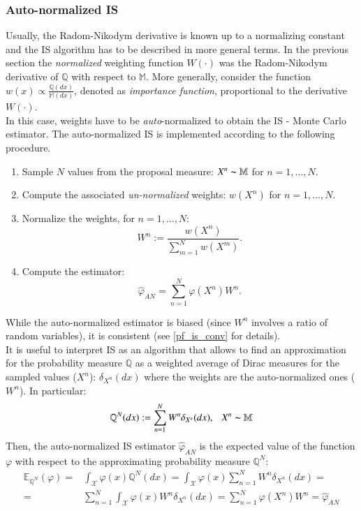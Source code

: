 \documentclass[
]{book}
\theoremstyle{break}
\theoremstyle{nonumberplain}
\begin{document}
\subsubsection{Auto-normalized IS}

Usually, the Radom-Nikodym derivative is known up to a normalizing
constant and the IS algorithm has to be described in more general terms.
In the previous section the \textit{normalized} weighting function
\(W(\cdot)\) was the Radom-Nikodym derivative of \(\mathbb Q\) with
respect to \(\mathbb M\). More generally, consider the function
\(w(x)\propto\frac{\mathbb Q(dx)}{\mathbb M(dx)}\), denoted as
\textit{importance function}, proportional to the derivative
\(W(\cdot)\).\\
In this case, weights have to be \textit{auto}-normalized to obtain the
IS - Monte Carlo estimator. The auto-normalized IS is implemented
according to the following procedure.

\begin{enumerate}
    \item Sample $N$ values from the proposal measure: $X^n\thicksim \mathbb M$ for $n=1,...,N$.
    \item Compute the associated \textit{un-normalized} weights: $w(X^n)$ for $n=1,...,N$.
    \item Normalize the weights, for $n=1,...,N$:
    \begin{equation*}
        W^n:=\frac{w(X^n)}{\sum_{m=1}^Nw(X^m)}.
    \end{equation*}
    \item Compute the estimator:
    \begin{equation*}
        \hat \varphi_{AN}=\sum_{n=1}^N\varphi (X^n)W^n.
    \end{equation*}
\end{enumerate}

While the auto-normalized estimator is biased (since \(W^n\) involves a
ratio of random variables), it is consistent (see \ref{pf_is_conv} for
details). ~\\
It is useful to interpret IS as an algorithm that allows to find an
approximation for the probability measure \(\mathbb Q\) as a weighted
average of Dirac measures for the sampled values (\(X^n\)):
\(\delta_{X^n}(dx)\) where the weights are the auto-normalized ones
(\(W^n\)). In particular: \begin{equation}
    \mathbb Q^N(dx):=\sum_{n=1}^NW^n\delta_{X^n}(dx), ~~~X^n\thicksim \mathbb M
\end{equation} Then, the auto-normalized IS estimator
\(\hat\varphi_{AN}\) is the expected value of the function \(\varphi\)
with respect to the approximating probability measure \(\mathbb Q^N\):
\begin{equation*}
    \begin{split}
        \mathbb E_{\mathbb Q^N}(\varphi)=&\int_\mathcal X\varphi(x)\mathbb Q^N(dx)=\int_\mathcal X\varphi(x)\sum_{n=1}^NW^n\delta_{X^n}(dx)=\\
       = &\sum_{n=1}^N\int_\mathcal X\varphi(x)W^n\delta_{X^n}(dx)=\sum_{n=1}^N\varphi (X^n)W^n=\hat \varphi_{AN}
    \end{split}
\end{equation*}
\end{document}
